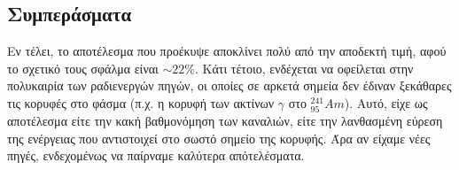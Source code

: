 \documentclass[a4paper]{article}
\begin{document}
		
\subsection*{Συμπεράσματα}

	Εν τέλει, το αποτέλεσμα που προέκυψε αποκλίνει πολύ από την αποδεκτή τιμή, αφού το σχετικό τους σφάλμα είναι $\sim22\%$. Κάτι τέτοιο, ενδέχεται να οφείλεται στην πολυκαιρία των ραδιενεργών πηγών, οι οποίες σε αρκετά σημεία δεν έδιναν ξεκάθαρες τις κορυφές στο φάσμα (π.χ. η κορυφή των ακτίνων $\gamma$ στο $^{241}_{95}Am$). Αυτό, είχε ως αποτέλεσμα είτε την κακή βαθμονόμηση των καναλιών, είτε την λανθασμένη εύρεση της ενέργειας που αντιστοιχεί στο σωστό σημείο της κορυφής. Άρα αν είχαμε νέες πηγές, ενδεχομένως να παίρναμε καλύτερα απότελέσματα.
\end{document}
